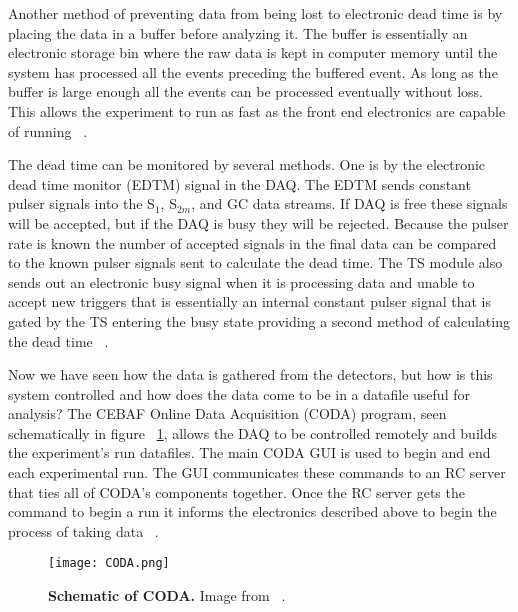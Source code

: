 Another method of preventing data from being lost to electronic dead time is by placing the data in a buffer before analyzing it. The buffer is essentially an electronic storage bin where the raw data is kept in computer memory until the system has processed all the events preceding the buffered event. As long as the buffer is large enough all the events can be processed eventually without loss. This allows the experiment to run as fast as the front end electronics are capable of running ~\cite{DAQ}. 

The dead time can be monitored by several methods. One is by the electronic dead time monitor (EDTM) signal in the DAQ. The EDTM sends constant pulser signals into the S$_1$, S$_{2m}$, and GC data streams. If DAQ is free these signals will be accepted, but if the DAQ is busy they will be rejected. Because the pulser rate is known the number of accepted signals in the final data can be compared to the known pulser signals sent to calculate the dead time. The TS module also sends out an electronic busy signal when it is processing data and unable to accept new triggers that is essentially an internal constant pulser signal that is gated by the TS entering the busy state providing a second method of calculating the dead time ~\cite{DAQ}. 

Now we have seen how the data is gathered from the detectors, but how is this system controlled and how does the data come to be in a datafile useful for analysis? The CEBAF Online Data Acquisition (CODA) program, seen schematically in figure ~\ref{fig:coda}, allows the DAQ to be controlled remotely and builds the experiment's run datafiles. The main CODA GUI is used to begin and end each experimental run. The GUI communicates these commands to an RC server that ties all of CODA's components together. Once the RC server gets the command to begin a run it informs the electronics described above to begin the process of taking data ~\cite{DAQ}. 

\begin{figure}[!ht]
\begin{center}
\texttt{[image: CODA.png]}
\end{center}
\caption{
{\bf{Schematic of CODA.}} Image from ~\cite{DAQ}.}
\label{fig:coda}
\end{figure}


